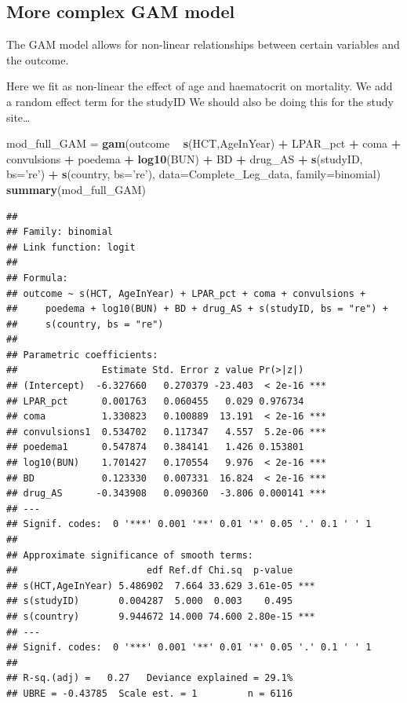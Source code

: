 \documentclass[]{article}
\newenvironment{Shaded}{\begin{snugshade}}{\end{snugshade}}
\newcommand{\KeywordTok}[1]{\textcolor[rgb]{0.13,0.29,0.53}{\textbf{#1}}}
\newcommand{\DataTypeTok}[1]{\textcolor[rgb]{0.13,0.29,0.53}{#1}}
\newcommand{\StringTok}[1]{\textcolor[rgb]{0.31,0.60,0.02}{#1}}
\newcommand{\OperatorTok}[1]{\textcolor[rgb]{0.81,0.36,0.00}{\textbf{#1}}}
\newcommand{\NormalTok}[1]{#1}
\begin{document}
\subsection{More complex GAM model}\label{more-complex-gam-model}

The GAM model allows for non-linear relationships between certain
variables and the outcome.

Here we fit as non-linear the effect of age and haematocrit on
mortality. We add a random effect term for the studyID We should also be
doing this for the study site\ldots{}

\begin{Shaded}
\begin{Highlighting}[]
\NormalTok{mod_full_GAM =}\StringTok{ }\KeywordTok{gam}\NormalTok{(outcome }\OperatorTok{~}\StringTok{ }\KeywordTok{s}\NormalTok{(HCT,AgeInYear) }\OperatorTok{+}\StringTok{ }\NormalTok{LPAR_pct  }\OperatorTok{+}\StringTok{ }\NormalTok{coma }\OperatorTok{+}\StringTok{ }\NormalTok{convulsions }\OperatorTok{+}
\StringTok{                     }\NormalTok{poedema }\OperatorTok{+}\StringTok{ }\KeywordTok{log10}\NormalTok{(BUN) }\OperatorTok{+}\StringTok{ }\NormalTok{BD }\OperatorTok{+}\StringTok{ }\NormalTok{drug_AS }\OperatorTok{+}\StringTok{ }
\StringTok{                     }\KeywordTok{s}\NormalTok{(studyID, }\DataTypeTok{bs=}\StringTok{'re'}\NormalTok{) }\OperatorTok{+}\StringTok{ }\KeywordTok{s}\NormalTok{(country, }\DataTypeTok{bs=}\StringTok{'re'}\NormalTok{),}
                   \DataTypeTok{data=}\NormalTok{Complete_Leg_data, }\DataTypeTok{family=}\NormalTok{binomial)}
\KeywordTok{summary}\NormalTok{(mod_full_GAM)}
\end{Highlighting}
\end{Shaded}

\begin{verbatim}
## 
## Family: binomial 
## Link function: logit 
## 
## Formula:
## outcome ~ s(HCT, AgeInYear) + LPAR_pct + coma + convulsions + 
##     poedema + log10(BUN) + BD + drug_AS + s(studyID, bs = "re") + 
##     s(country, bs = "re")
## 
## Parametric coefficients:
##               Estimate Std. Error z value Pr(>|z|)    
## (Intercept)  -6.327660   0.270379 -23.403  < 2e-16 ***
## LPAR_pct      0.001763   0.060455   0.029 0.976734    
## coma          1.330823   0.100889  13.191  < 2e-16 ***
## convulsions1  0.534702   0.117347   4.557  5.2e-06 ***
## poedema1      0.547874   0.384141   1.426 0.153801    
## log10(BUN)    1.701427   0.170554   9.976  < 2e-16 ***
## BD            0.123330   0.007331  16.824  < 2e-16 ***
## drug_AS      -0.343908   0.090360  -3.806 0.000141 ***
## ---
## Signif. codes:  0 '***' 0.001 '**' 0.01 '*' 0.05 '.' 0.1 ' ' 1
## 
## Approximate significance of smooth terms:
##                       edf Ref.df Chi.sq  p-value    
## s(HCT,AgeInYear) 5.486902  7.664 33.629 3.61e-05 ***
## s(studyID)       0.004287  5.000  0.003    0.495    
## s(country)       9.944672 14.000 74.600 2.80e-15 ***
## ---
## Signif. codes:  0 '***' 0.001 '**' 0.01 '*' 0.05 '.' 0.1 ' ' 1
## 
## R-sq.(adj) =   0.27   Deviance explained = 29.1%
## UBRE = -0.43785  Scale est. = 1         n = 6116
\end{verbatim}
\end{document}
